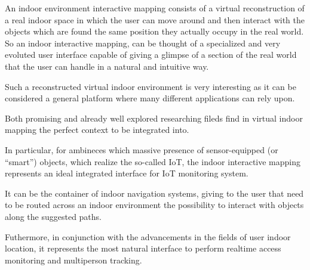 





An indoor environment interactive mapping consists of a virtual reconstruction of a real indoor space in which the user can move around and then interact with the objects which are found the same position they actually occupy in the real world.
So an indoor interactive mapping, can be thought of a specialized and very evoluted user interface capable of giving a glimpse of a section of the real world that the user can handle in a natural and intuitive way. 

Such a reconstructed virtual indoor environment is very interesting as it can be considered a general platform where many different applications can rely upon.

Both promising and already well explored researching fileds find in virtual indoor mapping the perfect context to be integrated into.

In particular, for ambineces which massive presence of sensor-equipped (or ``smart'') objects, which realize the so-called IoT, the indoor interactive mapping represents an ideal integrated interface for IoT monitoring system.

It can be the container of indoor navigation systems, giving to the user that need to be routed across an indoor environment the possibility to interact with objects along the suggested paths.

Futhermore, in conjunction with the advancements in the fields of user indoor location, it represents the most natural interface to perform realtime access monitoring and multiperson tracking.

